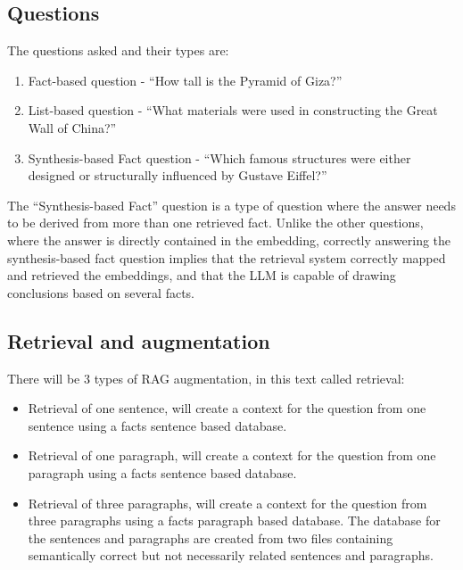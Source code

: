 \documentclass{wseas}
\begin{document}
\subsection{Questions}

The questions asked and their types are:

\begin{enumerate}
\def\labelenumi{\arabic{enumi}.}
\item
  Fact-based question - ``How tall is the Pyramid of Giza?''
\item
  List-based question - ``What materials were used in constructing the
  Great Wall of China?''
\item
  Synthesis-based Fact question - ``Which famous structures were either
  designed or structurally influenced by Gustave Eiffel?''
\end{enumerate}

The ``Synthesis-based Fact'' question is a type of question where the
answer needs to be derived from more than one retrieved fact. Unlike the
other questions, where the answer is directly contained in the
embedding, correctly answering the synthesis-based fact question implies
that the retrieval system correctly mapped and retrieved the embeddings,
and that the LLM is capable of drawing conclusions based on several
facts.


\subsection{Retrieval and
augmentation}

There will be 3 types of RAG augmentation, in this text called
retrieval:

\begin{itemize}

\item
  Retrieval of one sentence, will create a context for the question from
  one sentence using a facts sentence based database.
\item
  Retrieval of one paragraph, will create a context for the question
  from one paragraph using a facts sentence based database.
\item
  Retrieval of three paragraphs, will create a context for the question
  from three paragraphs using a facts paragraph based database. The
  database for the sentences and paragraphs are created from two files
  containing semantically correct but not necessarily related sentences
  and paragraphs.
\end{itemize}
\end{document}
